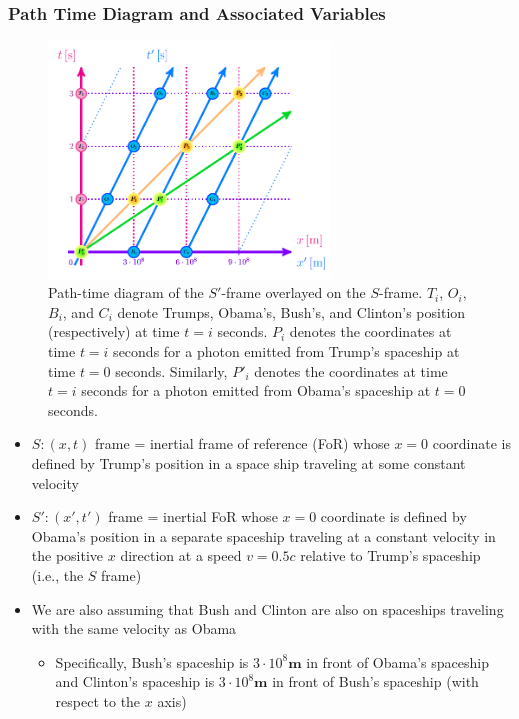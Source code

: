 \documentclass[a4paper]{article}
\begin{document}
			\subsubsection*{Path Time Diagram and Associated Variables}
				\begin{figure}[!htbp]
					\begin{center}
						\includegraphics[width=7.5cm]{pathtime1.png}
						\caption{Path-time diagram of the $S'$-frame overlayed on the $S$-frame. $T_i$, $O_i$, $B_i$, and $C_i$ denote Trumps, Obama's, Bush's, and Clinton's position (respectively) at time $t=i$ seconds. $P_i$ denotes the coordinates at time $t=i$ seconds for a photon emitted from Trump's spaceship at time $t=0$ seconds. Similarly, $P'_i$ denotes the coordinates at time $t=i$ seconds for a photon emitted from Obama's spaceship at $t=0$ seconds.}	
						\label{fig:pathtime}
					\end{center}
				\end{figure}
				\begin{itemize}
					\item $S:(x,t)$ frame = inertial frame of reference (FoR) whose $x=0$ coordinate is defined by Trump's position in a space ship traveling at some constant velocity 
					\item $S':(x',t')$ frame = inertial FoR whose $x=0$ coordinate is defined by Obama's position in a separate spaceship traveling at a constant velocity in the positive $x$ direction at a speed $v=0.5c$ relative to Trump's spaceship (i.e., the $S$ frame)
					\item We are also assuming that Bush and Clinton are also on spaceships traveling with the same velocity as Obama
					\begin{itemize}
						\item Specifically, Bush's spaceship is $3\cdot 10^8 \mathbf{m}$ in front of Obama's spaceship and Clinton's spaceship is $3\cdot 10^8 \mathbf{m}$ in front of Bush's spaceship (with respect to the $x$ axis) 
					\end{itemize}
				\end{itemize}						
\end{document}
